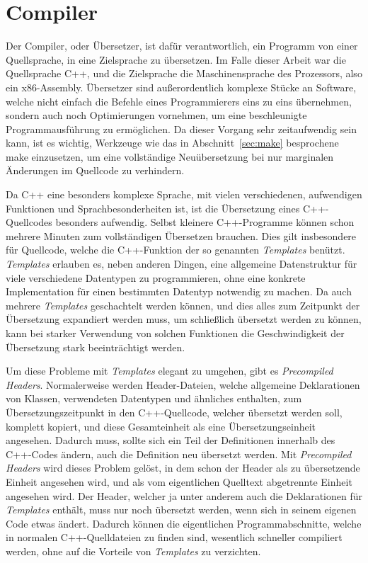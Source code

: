 \section{Compiler}
\label{sec:compiler}
Der Compiler, oder Übersetzer, ist dafür verantwortlich, ein Programm von einer Quellsprache, in eine Zielsprache zu übersetzen. Im Falle dieser Arbeit war die Quellsprache C++, und die
Zielsprache die Maschinensprache des Prozessors, also ein x86-Assembly. Übersetzer sind außerordentlich komplexe Stücke an Software, welche nicht einfach die Befehle eines Programmierers eins zu
eins übernehmen, sondern auch noch Optimierungen vornehmen, um eine beschleunigte Programmausführung zu ermöglichen. Da dieser Vorgang sehr zeitaufwendig sein kann, ist es wichtig, Werkzeuge wie
das in Abschnitt~\ref{sec:make} besprochene make einzusetzen, um eine vollständige Neuübersetzung bei nur marginalen Änderungen im Quellcode zu verhindern. 

Da C++ eine besonders komplexe Sprache, mit vielen verschiedenen, aufwendigen Funktionen und Sprachbesonderheiten ist, ist die Übersetzung eines C++-Quellcodes besonders aufwendig. Selbst kleinere
C++-Programme können schon mehrere Minuten zum vollständigen Übersetzen brauchen. Dies gilt insbesondere für Quellcode, welche die C++-Funktion der so genannten \textit{Templates} benützt. \textit{Templates}
erlauben es, neben anderen Dingen, eine allgemeine Datenstruktur für viele verschiedene Datentypen zu programmieren, ohne eine konkrete Implementation für einen bestimmten Datentyp notwendig zu machen.
Da auch mehrere \textit{Templates} geschachtelt werden können, und dies alles zum Zeitpunkt der Übersetzung expandiert werden muss, um schließlich übersetzt werden zu können, kann bei starker Verwendung
von solchen Funktionen die Geschwindigkeit der Übersetzung stark beeinträchtigt werden.

Um diese Probleme mit \textit{Templates} elegant zu umgehen, gibt es \textit{Precompiled Headers}. Normalerweise werden Header-Dateien, welche allgemeine Deklarationen von Klassen, verwendeten Datentypen
und ähnliches enthalten, zum Übersetzungszeitpunkt in den C++-Quellcode, welcher übersetzt werden soll, komplett kopiert, und diese Gesamteinheit als eine Über\-setzungs\-einheit angesehen. Dadurch muss, sollte
sich ein Teil der Definitionen innerhalb des C++-Codes ändern, auch die Definition neu übersetzt werden. Mit \textit{Precompiled Headers} wird dieses Problem gelöst, in dem schon der Header als zu übersetzende
Einheit angesehen wird, und als vom eigentlichen Quelltext abgetrennte Einheit angesehen wird. Der Header, welcher ja unter anderem auch die Deklarationen für \textit{Templates} enthält, muss nur noch
übersetzt werden, wenn sich in seinem eigenen Code etwas ändert. Dadurch können die eigentlichen Programmabschnitte, welche in normalen C++-Quelldateien zu finden sind, wesentlich schneller
compiliert werden, ohne auf die Vorteile von \textit{Templates} zu verzichten.



